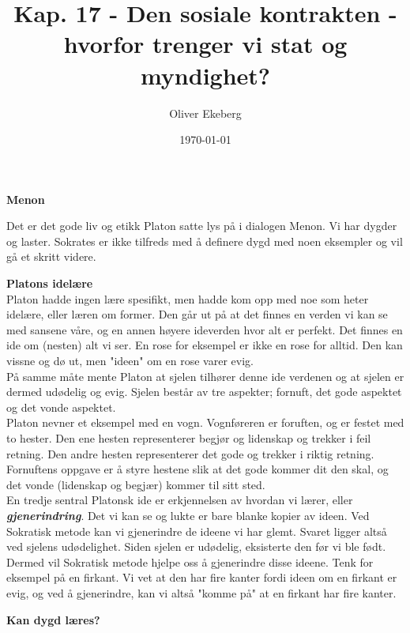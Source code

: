 \documentclass[11pt, a4paper]{article}
\title{Kap. 17 - Den sosiale kontrakten - hvorfor trenger vi stat og myndighet?}
\author{Oliver Ekeberg}
\date{\today}
\newenvironment{sectionbox}[1][]{%
    \begin{sectionboxinner}
    \textbf{\large #1}
    \vspace{1pt}
    \newline
}{%
    \end{sectionboxinner}
}
\newenvironment{subsectionbox}[1][]{%
    \begin{subsectionboxinner}
        {\bfseries #1}\\[-2pt]
}{%
    \end{subsectionboxinner}
}
\begin{document}
\maketitle

\tableofcontents


\begin{sectionbox}[Menon]
Det er det gode liv og etikk Platon satte lys på i dialogen Menon. Vi har dygder og laster. Sokrates er ikke tilfreds med å definere dygd med noen eksempler og vil gå et skritt videre.\\

\begin{subsectionbox}[Platons idelære]
Platon hadde ingen lære spesifikt, men hadde kom opp med noe som heter idelære, eller læren om former. Den går ut på at det finnes en verden vi kan se med sansene våre, og en annen høyere ideverden hvor alt er perfekt. Det finnes en ide om (nesten) alt vi ser. En rose for eksempel er ikke en rose for alltid. Den kan vissne og dø ut, men "ideen" om en rose varer evig.\\


På samme måte mente Platon at sjelen tilhører denne ide verdenen og at sjelen er dermed udødelig og evig. Sjelen består av tre aspekter; fornuft, det gode aspektet og det vonde aspektet.\\

Platon nevner et eksempel med en vogn. Vognføreren er foruften, og er festet med to hester. Den ene hesten representerer begjør og lidenskap og trekker i feil retning. Den andre hesten representerer det gode og trekker i riktig retning. Fornuftens oppgave er å styre hestene slik at det gode kommer dit den skal, og det vonde (lidenskap og begjær) kommer til sitt sted.\\


En tredje sentral Platonsk ide er erkjennelsen av hvordan vi lærer, eller \textbf{\textit{gjenerindring}}. Det vi kan se og lukte er bare blanke kopier av ideen. Ved Sokratisk metode kan vi gjenerindre de ideene vi har glemt. Svaret ligger altså ved sjelens udødelighet. Siden sjelen er udødelig, eksisterte den før vi ble født. Dermed vil Sokratisk metode hjelpe oss å gjenerindre disse ideene. Tenk for eksempel på en firkant. Vi vet at den har fire kanter fordi ideen om en firkant er evig, og ved å gjenerindre, kan vi altså "komme på" at en firkant har fire kanter.
\end{subsectionbox}

\begin{subsectionbox}[Kan dygd læres?]


\end{subsectionbox}
\end{sectionbox}
\end{document}
